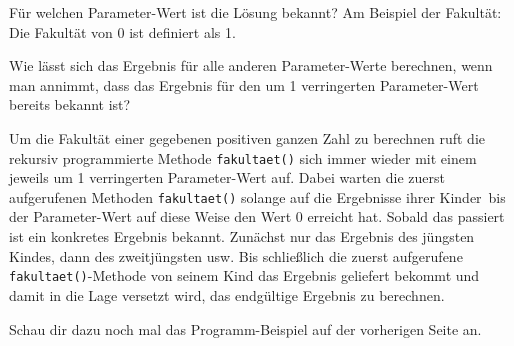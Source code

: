 \begin{compactenum}[1.]
\item Für welchen Parameter-Wert ist die Lösung bekannt? Am Beispiel der
Fakultät: Die Fakultät von 0 ist definiert als 1.
\item Wie lässt sich das Ergebnis für alle anderen Parameter-Werte berechnen,
wenn man annimmt, dass das Ergebnis für den um 1 verringerten Parameter-Wert
bereits bekannt ist?
\end{compactenum}

Um die Fakultät einer gegebenen positiven ganzen Zahl zu berechnen ruft die
rekursiv programmierte Methode \lstinline|fakultaet()| sich immer wieder mit
einem jeweils um 1 verringerten Parameter-Wert auf. Dabei warten die zuerst
aufgerufenen Methoden \lstinline|fakultaet()| solange auf die Ergebnisse ihrer
\glqq Kinder\grqq\ bis der Parameter-Wert auf diese Weise den Wert 0 erreicht
hat. Sobald das passiert ist ein konkretes Ergebnis bekannt. Zunächst nur das
Ergebnis des \glqq jüngsten Kindes\grqq , dann des zweitjüngsten usw. Bis
schließlich die zuerst aufgerufene \lstinline|fakultaet()|-Methode von seinem
Kind das Ergebnis geliefert bekommt und damit in die Lage versetzt wird, das
endgültige Ergebnis zu berechnen.

Schau dir dazu noch mal das Programm-Beispiel auf der vorherigen Seite an.

